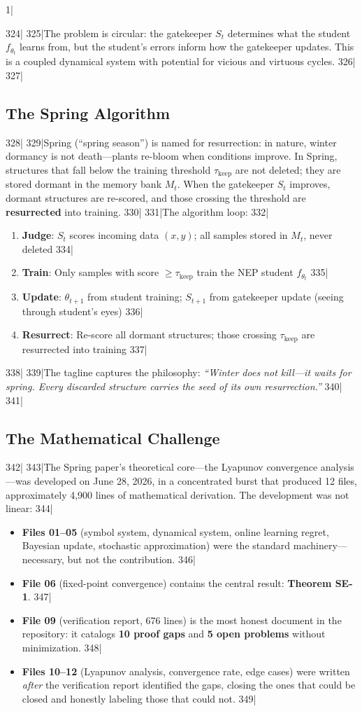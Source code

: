 1|\documentclass[12pt,a4paper]{article}
\begin{document}
324|
325|The problem is circular: the gatekeeper $S_t$ determines what the student $f_{\theta_t}$ learns from, but the student's errors inform how the gatekeeper updates. This is a coupled dynamical system with potential for vicious and virtuous cycles.
326|
327|\subsection{The Spring Algorithm}
328|
329|Spring (``spring season'') is named for resurrection: in nature, winter dormancy is not death—plants re-bloom when conditions improve. In Spring, structures that fall below the training threshold $\tau_{\text{keep}}$ are not deleted; they are stored dormant in the memory bank $M_t$. When the gatekeeper $S_t$ improves, dormant structures are re-scored, and those crossing the threshold are \textbf{resurrected} into training.
330|
331|The algorithm loop:
332|\begin{enumerate}
333|\item \textbf{Judge}: $S_t$ scores incoming data $(x, y)$; all samples stored in $M_t$, never deleted
334|\item \textbf{Train}: Only samples with score $\geq \tau_{\text{keep}}$ train the NEP student $f_{\theta_t}$
335|\item \textbf{Update}: $\theta_{t+1}$ from student training; $S_{t+1}$ from gatekeeper update (seeing through student's eyes)
336|\item \textbf{Resurrect}: Re-score all dormant structures; those crossing $\tau_{\text{keep}}$ are resurrected into training
337|\end{enumerate}
338|
339|The tagline captures the philosophy: \textit{``Winter does not kill—it waits for spring. Every discarded structure carries the seed of its own resurrection.''}
340|
341|\subsection{The Mathematical Challenge}
342|
343|The Spring paper's theoretical core—the Lyapunov convergence analysis—was developed on June 28, 2026, in a concentrated burst that produced 12 files, approximately 4,900 lines of mathematical derivation. The development was not linear:
344|\begin{itemize}
345|\item \textbf{Files 01–05} (symbol system, dynamical system, online learning regret, Bayesian update, stochastic approximation) were the standard machinery—necessary, but not the contribution.
346|\item \textbf{File 06} (fixed-point convergence) contains the central result: \textbf{Theorem SE-1}.
347|\item \textbf{File 09} (verification report, 676 lines) is the most honest document in the repository: it catalogs \textbf{10 proof gaps} and \textbf{5 open problems} without minimization.
348|\item \textbf{Files 10–12} (Lyapunov analysis, convergence rate, edge cases) were written \textit{after} the verification report identified the gaps, closing the ones that could be closed and honestly labeling those that could not.
349|\end{itemize}
\end{document}

